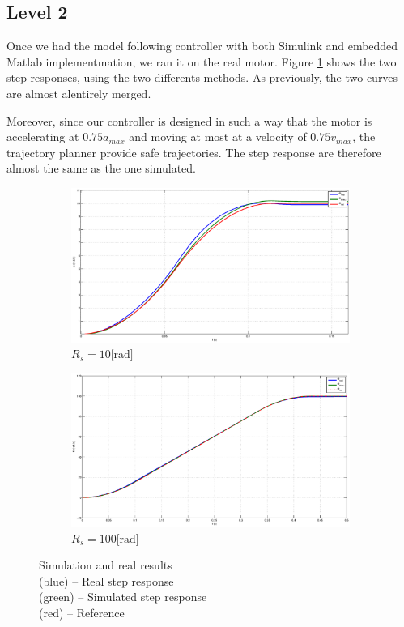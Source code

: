 \subsection*{Level 2}

Once we had the model following controller with both Simulink and embedded Matlab implementmation, we ran it on the real motor. Figure \ref{realresults} shows the two step responses, using the two differents methods. As previously, the two curves are almost alentirely merged.

Moreover, since our controller is designed in such a way that the motor is accelerating at $0.75 a_{max}$ and moving at most at a velocity of $0.75 v_{max}$, the trajectory planner provide safe trajectories. The step response are therefore almost the same as the one simulated.

\begin{figure}[hb]
  \centering
 \begin{subfigure}[b]{\linewidth}
 \includegraphics[width=\columnwidth]{fig/10rad.eps}
 \caption{$R_s = 10\text{[rad]}$}
 \end{subfigure}
 \begin{subfigure}[b]{\linewidth}
 \includegraphics[width=\columnwidth]{fig/100rad.eps}
 \caption{$R_s = 100\text{[rad]}$}
 \end{subfigure}
 \caption{Simulation and real results \\ (blue) -- Real step response \\ (green) -- Simulated step response \\ (red) -- Reference}
 \label{realresults}
\end{figure}
